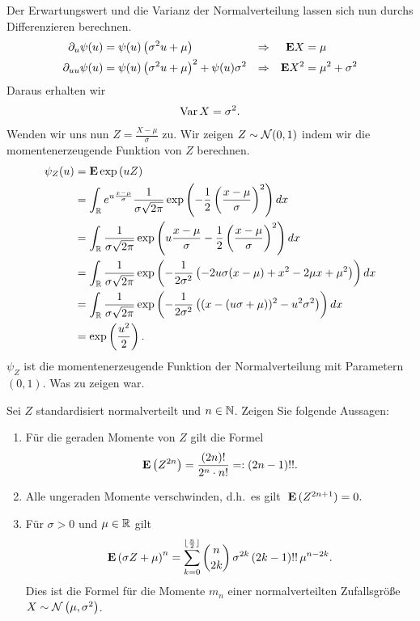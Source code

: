 Der Erwartungswert und die Varianz der Normalverteilung lassen sich nun durchs
Differenzieren berechnen. 
\begin{align*}
    \partial_u \psi(u) &= \psi(u) \left( \sigma^2 u + \mu \right) &\Rightarrow && \mathbf{E} X &= \mu \\
    \partial_{uu} \psi(u) &= \psi(u) \left( \sigma^2 u + \mu \right)^2 + \psi(u) \sigma^2
    & \Rightarrow && \mathbf{E} X^2 &= \mu^2 + \sigma^2
\end{align*}
Daraus erhalten wir 
\begin{align*}
    \operatorname{Var} X = \sigma^2.
\end{align*}
Wenden wir uns nun $Z = \frac{X - \mu}{\sigma}$ zu. Wir zeigen $Z \sim \mathcal N(0,1)$ 
indem wir die momentenerzeugende Funktion von $Z$ berechnen.
\begin{align*}
    \psi_{Z}(u) &= \mathbf{E} \exp \left( u Z \right) \\
    &= \int_{\mathbb R} e^{u \frac{x-\mu}{\sigma}} \frac{1}{\sigma \sqrt{2\pi}}
    \exp \left( -\frac{1}{2} \left( \frac{x-\mu}{\sigma} \right)^2 \right) dx \\
    &= \int_{\mathbb R} \frac{1}{\sigma\sqrt{2\pi}} 
    \exp \left(  u \frac{x-\mu}{\sigma} -\frac{1}{2} \left( \frac{x-\mu}{\sigma} \right)^2 \right) dx \\
    &= \int_{\mathbb R} \frac{1}{\sigma\sqrt{2\pi}} 
    \exp \left( -\frac{1}{2\sigma^2} \left( 
    -2 u \sigma (x-\mu) + x^2 - 2 \mu x + \mu^2 
    \right) \right) dx \\
    &= \int_{\mathbb R} \frac{1}{\sigma\sqrt{2\pi}} 
    \exp \left( -\frac{1}{2\sigma^2} \left( 
    (x - (u\sigma+\mu))^2 - u^2 \sigma^2 \right) \right) dx \\
    &= \exp \left( \frac{u^2}{2} \right).
\end{align*}
$\psi_{Z}$ ist die momentenerzeugende Funktion der Normalverteilung mit 
Parametern $(0,1)$. Was zu zeigen war. 


Sei $Z$ standardisiert normalverteilt und $n\in\mathbb N$. Zeigen Sie folgende Aussagen:
\begin{enumerate}
    \item Für die geraden Momente von $Z$ gilt die Formel
        \begin{equation*}
            \mathbf E\left( Z^{2n} \right) = \frac{(2n)!}{2^n \cdot n!} =: \left( 2n-1 \right)!!.
        \end{equation*}
    \item Alle ungeraden Momente verschwinden, d.h.~es gilt  $\; \mathbf E \,(Z^{2n+1})=0.$
    \item Für $\sigma>0$ und $\mu\in\mathbb R$ gilt
        \begin{equation*}
            \mathbf E \left( \sigma Z + \mu \right)^n = 
            \sum_{k=0}^{\lfloor\frac{n}{2}\rfloor} \binom{n}{2k} \,\sigma^{2k} \left( 2k-1 \right)!!\, \mu^{n-2k}.
        \end{equation*}
        Dies ist die Formel für die Momente $m_{n}$ einer normalverteilten
        Zufallsgröße \linebreak $X \sim \mathcal N \left( \mu, \sigma^2 \right)$. 
\end{enumerate}

